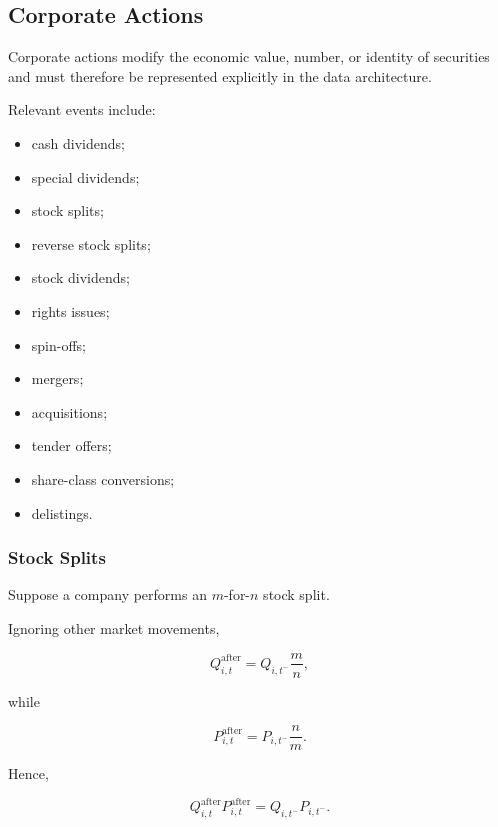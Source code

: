 \documentclass[11pt,a4paper]{article}
\begin{document}
\subsection{Corporate Actions}
\label{subsec:corporate_actions}

Corporate actions modify the economic value, number, or identity of securities
and must therefore be represented explicitly in the data architecture.

Relevant events include:

\begin{itemize}
    \item cash dividends;
    \item special dividends;
    \item stock splits;
    \item reverse stock splits;
    \item stock dividends;
    \item rights issues;
    \item spin-offs;
    \item mergers;
    \item acquisitions;
    \item tender offers;
    \item share-class conversions;
    \item delistings.
\end{itemize}


\subsubsection{Stock Splits}

Suppose a company performs an $m$-for-$n$ stock split.

Ignoring other market movements,

\begin{equation}
Q_{i,t}^{\mathrm{after}}
=
Q_{i,t^-}
\frac{m}{n},
\end{equation}

while

\begin{equation}
P_{i,t}^{\mathrm{after}}
=
P_{i,t^-}
\frac{n}{m}.
\end{equation}

Hence,

\begin{equation}
Q_{i,t}^{\mathrm{after}}
P_{i,t}^{\mathrm{after}}
=
Q_{i,t^-}
P_{i,t^-}.
\end{equation}
\end{document}
